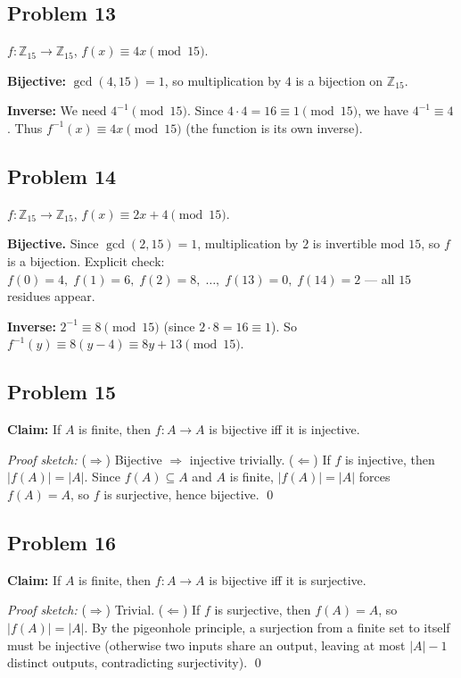 \subsection*{Problem 13}
$f:\mathbb{Z}_{15}\to\mathbb{Z}_{15}$, $f(x)\equiv 4x\pmod{15}$.

\textbf{Bijective:} $\gcd(4,15)=1$, so multiplication by $4$ is a bijection on $\mathbb{Z}_{15}$.

\textbf{Inverse:} We need $4^{-1}\pmod{15}$. Since $4\cdot 4=16\equiv 1\pmod{15}$, we have $4^{-1}\equiv 4$. Thus $f^{-1}(x)\equiv 4x\pmod{15}$ (the function is its own inverse).

\subsection*{Problem 14}
$f:\mathbb{Z}_{15}\to\mathbb{Z}_{15}$, $f(x)\equiv 2x+4\pmod{15}$.

\textbf{Bijective.} Since $\gcd(2,15)=1$, multiplication by $2$ is invertible mod $15$, so $f$ is a bijection. Explicit check: $f(0)=4,\;f(1)=6,\;f(2)=8,\;\ldots,\;f(13)=0,\;f(14)=2$ --- all $15$ residues appear.

\textbf{Inverse:} $2^{-1}\equiv 8\pmod{15}$ (since $2\cdot 8=16\equiv 1$). So $f^{-1}(y)\equiv 8(y-4)\equiv 8y+13\pmod{15}$.

\subsection*{Problem 15}
\textbf{Claim:} If $A$ is finite, then $f:A\to A$ is bijective iff it is injective.

\emph{Proof sketch:} ($\Rightarrow$) Bijective $\Rightarrow$ injective trivially. ($\Leftarrow$) If $f$ is injective, then $|f(A)|=|A|$. Since $f(A)\subseteq A$ and $A$ is finite, $|f(A)|=|A|$ forces $f(A)=A$, so $f$ is surjective, hence bijective. \qed

\subsection*{Problem 16}
\textbf{Claim:} If $A$ is finite, then $f:A\to A$ is bijective iff it is surjective.

\emph{Proof sketch:} ($\Rightarrow$) Trivial. ($\Leftarrow$) If $f$ is surjective, then $f(A)=A$, so $|f(A)|=|A|$. By the pigeonhole principle, a surjection from a finite set to itself must be injective (otherwise two inputs share an output, leaving at most $|A|-1$ distinct outputs, contradicting surjectivity). \qed

